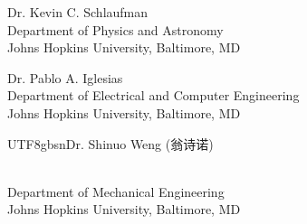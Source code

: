 \begin{singlespace}
    \vspace{0.1in}

    \begin{minipage}[t]{0.45\textwidth}
    Dr. Kevin C. Schlaufman \\[0.05in]
    {\normalsize Department of Physics and Astronomy\\
    Johns Hopkins University, Baltimore, MD }
    \end{minipage}
    \hfill
    \begin{minipage}[t]{0.51\textwidth}
    Dr. Pablo A. Iglesias \\[0.05in]
    {\normalsize Department of Electrical and Computer Engineering\\
    Johns Hopkins University, Baltimore, MD }
    \end{minipage}

    \vspace{0.1in}

    \begin{minipage}[t]{0.45\textwidth}
    \begin{CJK*}{UTF8}{gbsn}Dr. Shinuo Weng (翁诗诺)\end{CJK*}\\[0.05in]
    {\normalsize Department of Mechanical Engineering\\
    Johns Hopkins University, Baltimore, MD }
    \end{minipage}



\end{singlespace}